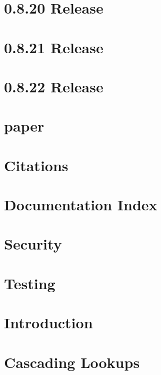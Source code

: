 \documentclass[twoside]{book}
\newcommand{\+}{\discretionary{\mbox{\scriptsize$\hookleftarrow$}}{}{}}
\begin{document}
\chapter{0.8.20 Release}
\label{doc_news_2017-10-31_0_8_20_md}

\chapter{0.8.21 Release}
\label{doc_news_2017-12-22_0_8_21_md}

\chapter{0.8.22 Release}
\label{doc_news_2018-03-27_0_8_22_md}

\chapter{paper}
\label{md_doc_paper_paper}

\chapter{Citations}
\label{doc_paper_README_md}

\chapter{Documentation Index}
\label{doc_README_md}

\chapter{Security}
\label{doc_SECURITY_md}

\chapter{Testing}
\label{doc_TESTING_md}

\chapter{Introduction}
\label{doc_tutorials_application-integration_md}

\chapter{Cascading Lookups}
\label{doc_tutorials_cascading_md}

\end{document}
